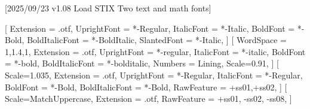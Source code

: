 
[2025/09/23 v1.08 Load STIX Two text and math fonts]

%
%
\ifpdftex
	\RequirePackage[T1]{fontenc}	
	\RequirePackage{bm}
\else
    \RequirePackage[warnings-off={mathtools-colon,mathtools-overbracket},mathbf=sym]{unicode-math}
    \setmainfont{STIXTwoText}[
       	Extension = .otf,
    	UprightFont = *-Regular,
    	ItalicFont = *-Italic,
    	BoldFont = *-Bold,
    	BoldItalicFont = *-BoldItalic,
		SlantedFont = *-Italic,
	]
	\setsansfont{texgyreheros}[ 
		WordSpace = {1,1.4,1},
		Extension = .otf,
    	UprightFont = *-regular,
    	ItalicFont = *-italic,
    	BoldFont = *-bold,
    	BoldItalicFont = *-bolditalic,
		Numbers = Lining,
    	Scale=0.91,%
	]        
	\setmonofont{Inconsolatazi4}[
        Scale=1.035,%
        Extension = .otf,
        UprightFont = *-Regular,
        ItalicFont = *-Regular,%
        BoldFont = *-Bold, 
    	BoldItalicFont = *-Bold,%
        RawFeature = {+ss01,+ss02}, %
    ]             
	[
    	Scale=MatchUppercase,
    	Extension = .otf,
    	RawFeature = {+ss01, -ss02, -ss08},
   ]
   \newcommand*{\FRAC}[1]{{\addfontfeature{Fractions=On}#1}}%
\fi